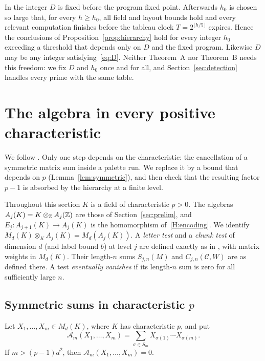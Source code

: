 \begin{remark}\label{rem:parameters}
In \cite[Section~2.5]{OAI247periodic} the integer $D$ is fixed before the program fixed point. Afterwards $h_0$ is chosen
so large that, for every $h\geq h_0$, all field and layout bounds hold and every relevant computation finishes before the
tableau clock $T=2^{\lfloor h/5\rfloor}$ expires. Hence the conclusions of Proposition~\ref{prop:hierarchy} hold for every
integer $h_0$ exceeding a threshold that depends only on $D$ and the fixed program. Likewise $D$ may be any integer
satisfying~\eqref{eq:D}. Neither Theorem~A nor Theorem~B needs this freedom: we fix $D$ and $h_0$ once and for all, and
Section~\ref{sec:detection} handles every prime with the same table.
\end{remark}

\section{The algebra in every positive characteristic}\label{sec:algebra}

We follow \cite[Section~3]{OAI247periodic}. Only one step depends on the characteristic: the cancellation of a symmetric
matrix sum inside a palette run. We replace it by a bound that depends on $p$ (Lemma~\ref{lem:symmetric}), and then check that the resulting
factor $p-1$ is absorbed by the hierarchy at a finite level.

Throughout this section $K$ is a field of characteristic $p>0$. The algebras $A_j(K)=K\otimes_{\mathbb Z}A_j(\mathbb Z)$ are those of
Section~\ref{sec:prelim}, and $E_j:A_{j+1}(K)\to A_j(K)$ is the homomorphism of~\ref{H:encoding}. We identify
$M_d(K)\otimes_KA_j(K)=M_d(A_j(K))$. A \emph{letter test} and a \emph{chunk test} of dimension $d$ (and label bound $b$)
at level $j$ are defined exactly as in \cite[Definition~3.1]{OAI247periodic}, with matrix weights in $M_d(K)$. Their
length-$n$ sums $S_{j,n}(M)$ and $C_{j,n}(\mathcal C,W)$ are as defined there. A test
\emph{eventually vanishes} if its length-$n$ sum is zero for all sufficiently large $n$.

\subsection{Symmetric sums in characteristic \texorpdfstring{$p$}{p}}

\begin{lemma}\label{lem:symmetric}
Let $X_1,\dots,X_m\in M_d(K)$, where $K$ has characteristic $p$, and put
\[
 \mathcal A_m(X_1,\dots,X_m)=\sum_{\sigma\in S_m}X_{\sigma(1)}\cdots X_{\sigma(m)}.
\]
If $m>(p-1)d^2$, then $\mathcal A_m(X_1,\dots,X_m)=0$.
\end{lemma}


